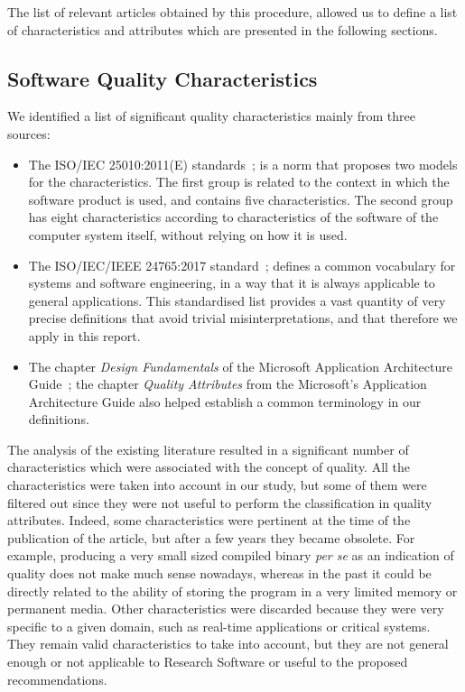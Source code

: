 The list of relevant articles obtained by this procedure, allowed us to define a list of characteristics and attributes which are presented in the following sections.

\subsection{Software Quality Characteristics}
\label{subsect:sqchar}

We identified a list of significant quality characteristics mainly from three sources:

\begin{itemize}
    \item The ISO/IEC 25010:2011(E) standards~\cite{iso_25010_2011_2017}; is a norm that proposes two models for the characteristics. The first group is related to the context in which the software product is used, and contains five characteristics. The second group has eight characteristics according to characteristics of the software of the computer system itself, without relying on how it is used.

    \item The ISO/IEC/IEEE 24765:2017 standard~\cite{iso_iec_24765_2017}; defines a common vocabulary for systems and software engineering, in a way that it is always applicable to general applications. This standardised list provides a vast quantity of very precise definitions that avoid trivial misinterpretations, and that therefore we apply in this report.

    \item The chapter \textit{Design Fundamentals} of the Microsoft Application Architecture Guide~\cite{microsoft_2010}; the chapter \textit{Quality Attributes} from the Microsoft's Application Architecture Guide also helped establish a common terminology in our definitions.

\end{itemize}

The analysis of the existing literature resulted in a significant number of characteristics which were associated with the concept of quality. All the characteristics were taken into account in our study, but some of them were filtered out since they were not useful to perform the classification in quality attributes. Indeed, some characteristics were pertinent at the time of the publication of the article, but after a few years they became obsolete. For example, producing a very small sized compiled binary \textit{per se} as an indication of quality does not make much sense nowadays, whereas in the past it could be directly related to the ability of storing the program in a very limited memory or permanent media. Other characteristics were discarded because they were very specific to a given domain, such as real-time applications or critical systems. They remain valid characteristics to take into account, but they are not general enough or not applicable to Research Software or useful to the proposed recommendations.

